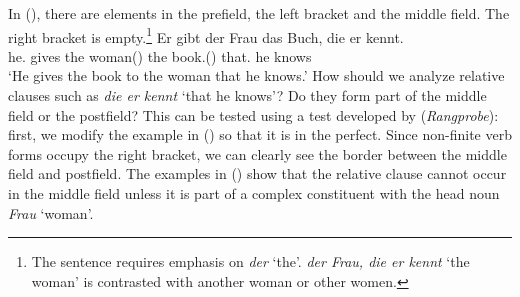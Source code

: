 {In (), there are elements in the prefield, the left bracket and the middle field. The right
bracket is empty.\footnote{
  The sentence requires emphasis on \emph{der} `the'. \emph{der Frau, die er kennt} `the woman' is
  contrasted with another woman or other women.
}
\ea
\gll Er        gibt  der Frau        das Buch,       die er kennt.\\
     he.\mas{} gives the woman(\fem) the book.(\neu) that.\fem{} he knows\\
\glt `He gives the book to the woman that he knows.'
\z 
How should we analyze relative clauses such as
\emph{die er kennt} `that he knows'? Do they form part of the middle field or the postfield?
This can be tested using a test developed by \citet[]{Bech55a} (\emph{Rangprobe}):
first, we modify the example in () so that it is in the perfect. Since non-finite verb forms occupy the right bracket, we
can clearly see the border between the middle field and postfield. The examples in () show that the relative clause cannot
occur in the middle field unless it is part of a complex constituent with the head noun \emph{Frau} `woman'.
\eal
{}
\zl

}
